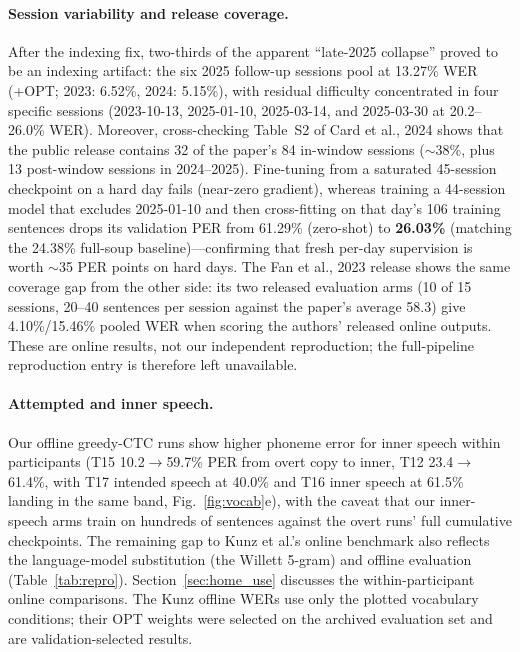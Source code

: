\documentclass[11pt]{article}
\begin{document}
\paragraph{Session variability and release coverage.} After the
indexing fix, two-thirds of the apparent ``late-2025 collapse'' proved
to be an indexing artifact: the six 2025 follow-up sessions pool at
13.27\% WER (+OPT; 2023: 6.52\%, 2024: 5.15\%), with residual difficulty
concentrated in four specific sessions (2023-10-13, 2025-01-10,
2025-03-14, and 2025-03-30 at 20.2--26.0\% WER). Moreover, cross-checking
Table~S2 of Card et al., 2024 shows that the public release contains 32
of the paper's 84 in-window sessions ($\sim$38\%, plus 13 post-window
sessions in 2024--2025). Fine-tuning from a saturated 45-session
checkpoint on a hard day fails (near-zero gradient), whereas training a
44-session model that excludes 2025-01-10 and then cross-fitting on that
day's 106 training sentences drops its validation PER from 61.29\%
(zero-shot) to \textbf{26.03\%} (matching the 24.38\% full-soup baseline)---confirming
that fresh per-day supervision is worth $\sim$35 PER points on hard days.
The Fan et al., 2023 release shows the same coverage gap from the other
side: its two released evaluation arms (10 of 15 sessions, 20--40
sentences per session against the paper's average 58.3) give
4.10\%/15.46\% pooled WER when scoring the authors' released online
outputs. These are online results, not our independent reproduction;
the full-pipeline reproduction entry is therefore left unavailable.

\paragraph{Attempted and inner speech.} Our offline greedy-CTC runs
show higher phoneme error for inner speech within participants (T15
10.2$\to$59.7\% PER from overt copy to inner, T12 23.4$\to$61.4\%,
with T17 intended speech at 40.0\% and T16 inner speech at 61.5\%
landing in the same band, Fig.~\ref{fig:vocab}e), with the caveat
that our inner-speech arms train on hundreds of sentences against the
overt runs' full cumulative checkpoints. The remaining gap to
Kunz et al.'s online benchmark also reflects the language-model
substitution (the Willett 5-gram) and offline evaluation
(Table~\ref{tab:repro}). Section~\ref{sec:home_use} discusses the
within-participant online comparisons. The Kunz offline WERs use
only the plotted vocabulary conditions; their OPT weights were selected
on the archived evaluation set and are validation-selected results.
\end{document}
